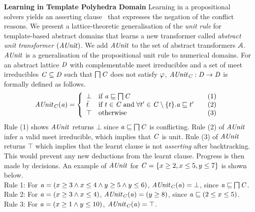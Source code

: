 \noindent \textbf{Learning in Template Polyhedra Domain}
%
Learning in a propositional solvers yields an asserting
clause~\cite{cdcl} that expresses the negation of the conflict
reasons.  We present a lattice-theoretic generalisation of the 
{\em unit rule} for template-based abstract domains that learns a new 
transformer called {\em abstract unit transformer} $(\mathit{AUnit})$.    
We add $\mathit{AUnit}$ to the set of abstract transformers $\mathcal{A}$. 
$\mathit{AUnit}$ is a generalisation of the propositional unit rule to
numerical domains.  For an abstract lattice $\mathit{D}$ with
complementable meet irreducibles and a set of meet irreducibles $\mathit{C}
\subseteq \mathit{D}$ such that $\bigsqcap
\mathit{C}$ does not satisfy $\varphi$, $\mathit{AUnit}_{\mathit{C}}: \mathit{D} \rightarrow
\mathit{D}$ is formally defined as follows.
\[ \aunit_\conflictset(\absval) =
 \left\{\begin{array}{l@{\quad}l@{\qquad}l}
  \bot       & \text{if } \absval \sqsubseteq \bigsqcap \conflictset & (1)\\
  \bar{t}    & \text{if } t \in \conflictset \; \text{and} \; \forall t' \in \conflictset
  \setminus \{t\}. \absval  \sqsubseteq t' & (2) \\
  \top & \text{otherwise} & (3) \\
 \end{array}\right.
\]
Rule (1) shows $\mathit{AUnit}$ returns $\bot$ since 
$\mathit{a} \sqsubseteq \bigsqcap \mathit{C}$ is conflicting.  
Rule (2) of $\mathit{AUnit}$ infer a valid meet irreducible, 
which implies that $\mathit{C}$ is unit.  Rule (3) of  
$\mathit{AUnit}$ returns $\top$ which implies that the learnt clause is not 
{\em asserting} after backtracking.  This would prevent any new 
deductions from the learnt clause. Progress is then made by decisions. An 
example of $\mathit{AUnit}$ for $\mathit{C} = \{x \geq 2, x \leq 5, y \leq 7 \}$ is
shown below. \\
%
Rule 1: 
For $\mathit{a} = (x \geq 3\wedge\allowbreak x \leq
4\wedge\allowbreak y \geq 5\wedge y \leq 6)$, 
$\mathit{AUnit}_{\mathit{C}}(\mathit{a}) = \bot$, since $\mathit{a}
\sqsubseteq \bigsqcap\mathit{C}$.  \\ 
Rule 2:  
For $\mathit{a} = (x \geq 3\wedge x \leq 4)$,  
$\mathit{AUnit}_{\mathit{C}}(\mathit{a}) = (y \geq 8)$, since
$\mathit{a} \sqsubseteq (2 \leq x \leq 5)$. \\ 
%
Rule 3: 
For $\mathit{a} = (x \geq 1\wedge y \leq 10)$, 
$\mathit{AUnit}_{\mathit{C}}(\mathit{a}) = \top$. \\


